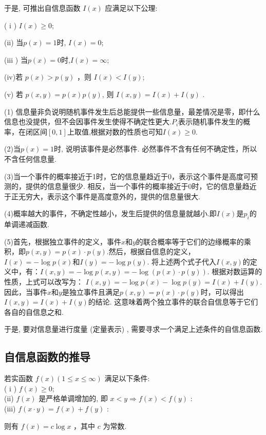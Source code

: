 于是, 可推出自信息函数 $ I(x) $ 应满足以下公理:
\begin{axiom}
( i ) $ I(x) \geqslant 0 $;

(ii) 当$ p(x)=1$时, $I(x)=0 $;

(iii ) 当$ p(x)=0$时,$ I(x)=\infty $;

(iv)若 $ p(x)>p(y) $ ，则 $ I(x)<I(y) $;

 (v)  若 $ p(x, y)=p(x) p(y) $, 则 $ I(x, y)=I(x)+I(y) $ .
\end{axiom}
\begin{note}
    (1) 信息量非负说明随机事件发生后总能提供一些信息量，最差情况是零，即什么信息也没提供，但不会因事件发生使得不确定性更大.$P_i$表示随机事件发生的概率，在闭区间$[0,1]$上取值,根据对数的性质也可知$I(x)\geqslant 0$.

    (2)当$ p(x)=1$时, 说明该事件是必然事件. 必然事件不含有任何不确定性，所以不含任何信息量.

    (3)当一个事件的概率接近于1时，它的信息量趋近于0，表示这个事件是高度可预测的，提供的信息量很少. 相反，当一个事件的概率接近于0时，它的信息量趋近于正无穷大，表示这个事件是高度意外的，提供的信息量很大.

    (4)概率越大的事件，不确定性越小，发生后提供的信息量就越小.即$I(x)$是$p_i$的单调递减函数.

    (5)首先，根据独立事件的定义，事件$x$和$y$的联合概率等于它们的边缘概率的乘积，即$p(x, y) = p(x) \cdot p(y)$.然后，根据自信息的定义，$I(x) = -\log p(x)$和$I(y) = -\log p(y)$. 将上述两个式子代入$I(x, y)$的定义中，有：$I(x, y) = -\log p(x, y) = -\log (p(x) \cdot p(y))$. 根据对数运算的性质，上式可以改写为：
$I(x, y) = -\log p(x) - \log p(y) = I(x) + I(y)$. 因此，当事件$x$和$y$是独立事件且满足$p(x, y) = p(x) \cdot p(y)$时，可以得出$I(x, y) = I(x) + I(y)$的结论. 这意味着两个独立事件的联合自信息等于它们各自的自信息之和.
\end{note}


于是, 要对信息量进行度量 (定量表示) , 需要寻求一个满足上述条件的自信息函数.

\subsection{自信息函数的推导}
\begin{lemma}
若实函数 $ f(x)(1 \leqslant x \leqslant \infty) $ 满足以下条件:\\
( i ) $ f(x) \geqslant 0 $;\\
(ii) $ f(x) $ 是严格单调增加的, 即 $ x<y \Rightarrow f(x)<f(y) $ :\\
(iii) $ f(x \cdot y)=f(x)+f(y) $ :

则有 $ f(x)=c \log x $ ，其中 $ c $ 为常数.


\end{lemma}

